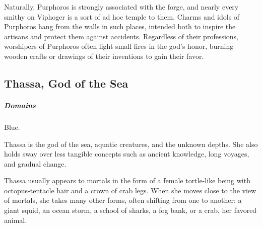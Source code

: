         Naturally, Purphoros is strongly associated with the forge, and nearly every smithy on Viphoger is a sort of ad hoc temple to them.
        Charms and idols of Purphoros hang from the walls in such places, intended both to inspire the artisans and protect them against accidents.
        Regardless of their professions, worshipers of Purphoros often light small fires in the god's honor, burning wooden crafts or drawings of their inventions to gain their favor.


%

\subsection*{Thassa, God of the Sea} \label{ssec::thassa}
    \subparagraph{Domains} Blue.

    Thassa is the god of the sea, aquatic creatures, and the unknown depths.
    She also holds sway over less tangible concepts such as ancient knowledge, long voyages, and gradual change.


    Thassa usually appears to mortals in the form of a female tortle-like being with octopus-tentacle hair and a crown of crab legs.
    When she moves close to the view of mortals, she takes many other forms, often shifting from one to another: a giant squid, an ocean storm, a school of sharks, a fog bank, or a crab, her favored animal.


